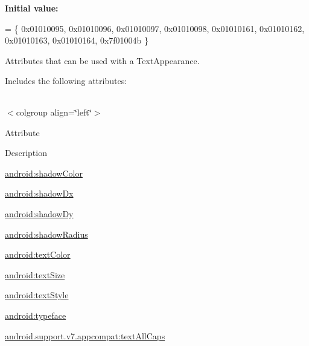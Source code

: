{\bfseries Initial value\+:}
\begin{DoxyCode}
= \{
            0x01010095, 0x01010096, 0x01010097, 0x01010098,
            0x01010161, 0x01010162, 0x01010163, 0x01010164,
            0x7f01004b
        \}
\end{DoxyCode}
Attributes that can be used with a Text\+Appearance. 

Includes the following attributes\+:

\tabulinesep=1mm
\begin{longtabu} spread 0pt [c]{*{0}{|X[-1]}|}
\hline
\end{longtabu}
$<$colgroup align=\char`\"{}left\char`\"{}$>$ 

Attribute

Description 

{\ttfamily \hyperlink{classandroid_1_1support_1_1v7_1_1appcompat_1_1R_1_1styleable_af7af20af0fdcad16682f70d50c5bc466}{android\+:shadow\+Color}}

{\ttfamily \hyperlink{classandroid_1_1support_1_1v7_1_1appcompat_1_1R_1_1styleable_ac5aa04839a33de4d0ac098bc99edbb61}{android\+:shadow\+Dx}}

{\ttfamily \hyperlink{classandroid_1_1support_1_1v7_1_1appcompat_1_1R_1_1styleable_a72e9c1ac38f54773710d1ffbaf7b7fdd}{android\+:shadow\+Dy}}

{\ttfamily \hyperlink{classandroid_1_1support_1_1v7_1_1appcompat_1_1R_1_1styleable_abc79ced8270630311e6bc0c67b718446}{android\+:shadow\+Radius}}

{\ttfamily \hyperlink{classandroid_1_1support_1_1v7_1_1appcompat_1_1R_1_1styleable_a98071a56321cacaafd32bed6c5659547}{android\+:text\+Color}}

{\ttfamily \hyperlink{classandroid_1_1support_1_1v7_1_1appcompat_1_1R_1_1styleable_ad99b42fc58cdb8501069528506ff2241}{android\+:text\+Size}}

{\ttfamily \hyperlink{classandroid_1_1support_1_1v7_1_1appcompat_1_1R_1_1styleable_af5a1023ffeb166c92684b04104b442ac}{android\+:text\+Style}}

{\ttfamily \hyperlink{classandroid_1_1support_1_1v7_1_1appcompat_1_1R_1_1styleable_a622359cefc99b73e3f85dcbdcac84e1a}{android\+:typeface}}

{\ttfamily \hyperlink{classandroid_1_1support_1_1v7_1_1appcompat_1_1R_1_1styleable_a7084742635a0a3f3c625dce61434c8d4}{android.\+support.\+v7.\+appcompat\+:text\+All\+Caps}}


